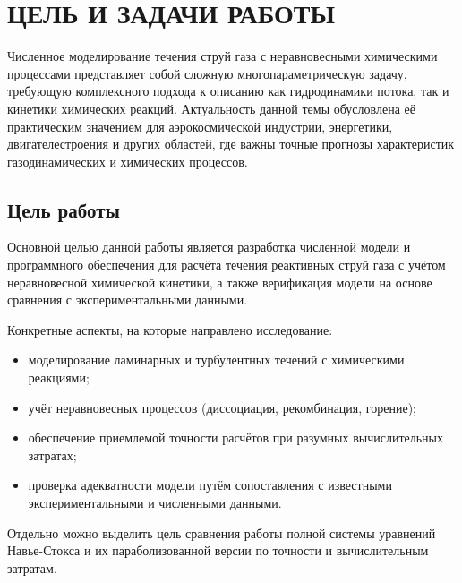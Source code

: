 \section{ЦЕЛЬ И ЗАДАЧИ РАБОТЫ} %

Численное моделирование течения струй газа с неравновесными химическими процессами представляет собой сложную многопараметрическую задачу, требующую комплексного подхода к описанию как гидродинамики потока, так и кинетики химических реакций. Актуальность данной темы обусловлена её практическим значением для аэрокосмической индустрии, энергетики, двигателестроения и других областей, где важны точные прогнозы характеристик газодинамических и химических процессов.

\subsection{Цель работы}

Основной целью данной работы является разработка численной модели и программного обеспечения для расчёта течения реактивных струй газа с учётом неравновесной химической кинетики, а также верификация модели на основе сравнения с экспериментальными данными.

Конкретные аспекты, на которые направлено исследование:

\begin{itemize}
    \item моделирование ламинарных и турбулентных течений с химическими реакциями;
    \item учёт неравновесных процессов (диссоциация, рекомбинация, горение);
    \item обеспечение приемлемой точности расчётов при разумных вычислительных затратах;
    \item проверка адекватности модели путём сопоставления с известными экспериментальными и численными данными.
\end{itemize}

Отдельно можно выделить цель сравнения работы полной системы уравнений Навье-Стокса и их параболизованной версии по точности и вычислительным затратам.



